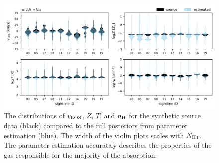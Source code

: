 \documentclass[fleqn,usenatbib]{mnras}
\begin{document}
\begin{figure}
    \centering
    \includegraphics[width=\textwidth]{figures/sample2/violin_rerun.pdf}
    \caption{
    The distributions of $v_{\rm LOS}$, $Z$, $T$, and $n_{\rm H}$ for the synthetic source data (black) compared to the full posteriors from parameter estimation (blue).
    The width of the violin plots scales with $N_{\ion{H}{I}}$.
    The parameter estimation accurately describes the properties of the gas responsible for the majority of the absorption.
    }
    \label{f: sample2 violin}
\end{figure}
\end{document}
